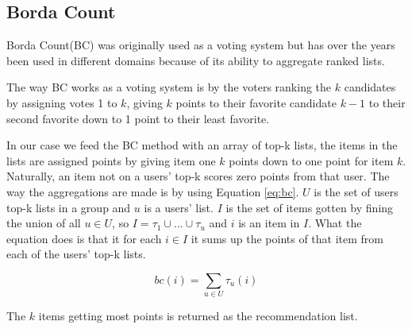 \subsection{Borda Count}\label{sec:bordacount}
Borda Count(BC) was originally used as a voting system but has over the years been used in different domains because of its ability to aggregate ranked lists\cite{Baltrunas:2010:GRR:1864708.1864733, Masthoff2004}.

The way BC works as a voting system is by the voters ranking the $k$ candidates by assigning votes 1 to $k$, giving $k$ points to their favorite candidate $k-1$ to their second favorite down to 1 point to their least favorite.

In our case we feed the BC method with an array of top-k lists, the items in the lists are assigned points by giving item one $k$ points down to one point for item $k$\cite{ourreport}.  Naturally, an item not on a users' top-k scores zero points from that user. The way the aggregations are made is by using Equation \ref{eq:bc}. $U$ is the set of users top-k lists in a group and $u$ is a users' list. $I$ is the set of items gotten by fining the union of all $u\in U$, so $I = \tau_1 \cup ... \cup \tau_u$ and $i$ is an item in $I$. What the equation does is that it for each $i\in I$ it sums up the points of that item from each of the users' top-k lists.


\begin{equation}\label{eq:bc}
bc(i) = \sum_{u\in U} \tau_u(i)
\end{equation}

The $k$ items getting most points is returned as the recommendation list.